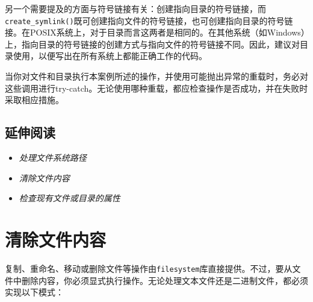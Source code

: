 



另一个需要提及的方面与符号链接有关：创建指向目录的符号链接，而\texttt{create\_\allowbreak{}symlink()}既可创建指向文件的符号链接，也可创建指向目录的符号链接。在POSIX系统上，对于目录而言这两者是相同的。在其他系统（如Windows）上，指向目录的符号链接的创建方式与指向文件的符号链接不同。因此，建议对目录使用，以便写出在所有系统上都能正确工作的代码。



\begin{myNote}[tip]
当你对文件和目录执行本案例所述的操作，并使用可能抛出异常的重载时，务必对这些调用进行try-catch。无论使用哪种重载，都应检查操作是否成功，并在失败时采取相应措施。
\end{myNote}



\subsection{延伸阅读}



\begin{itemize}
\item \textit{处理文件系统路径}



\item \textit{清除文件内容}



\item \textit{检查现有文件或目录的属性}

\end{itemize}



\section{清除文件内容}



复制、重命名、移动或删除文件等操作由\texttt{filesystem}库直接提供。不过，要从文件中删除内容，你必须显式执行操作。无论处理文本文件还是二进制文件，都必须实现以下模式：


